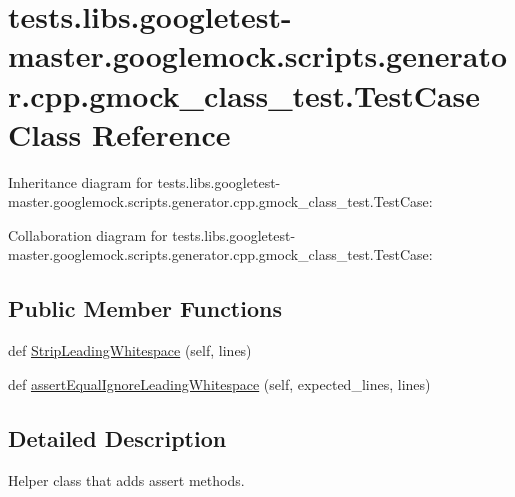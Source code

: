 \hypertarget{classtests_1_1libs_1_1googletest-master_1_1googlemock_1_1scripts_1_1generator_1_1cpp_1_1gmock__class__test_1_1TestCase}{}\section{tests.\+libs.\+googletest-\/master.googlemock.\+scripts.\+generator.\+cpp.\+gmock\+\_\+class\+\_\+test.\+Test\+Case Class Reference}
\label{classtests_1_1libs_1_1googletest-master_1_1googlemock_1_1scripts_1_1generator_1_1cpp_1_1gmock__class__test_1_1TestCase}


Inheritance diagram for tests.\+libs.\+googletest-\/master.googlemock.\+scripts.\+generator.\+cpp.\+gmock\+\_\+class\+\_\+test.\+Test\+Case\+:


Collaboration diagram for tests.\+libs.\+googletest-\/master.googlemock.\+scripts.\+generator.\+cpp.\+gmock\+\_\+class\+\_\+test.\+Test\+Case\+:
\subsection*{Public Member Functions}
\begin{DoxyCompactItemize}
\item 
def \hyperlink{classtests_1_1libs_1_1googletest-master_1_1googlemock_1_1scripts_1_1generator_1_1cpp_1_1gmock__class__test_1_1TestCase_a465deb85a3902d043e8713f08c2453a8}{Strip\+Leading\+Whitespace} (self, lines)
\item 
def \hyperlink{classtests_1_1libs_1_1googletest-master_1_1googlemock_1_1scripts_1_1generator_1_1cpp_1_1gmock__class__test_1_1TestCase_ac0f9b16096d5b52b568e268aa4c20dbf}{assert\+Equal\+Ignore\+Leading\+Whitespace} (self, expected\+\_\+lines, lines)
\end{DoxyCompactItemize}


\subsection{Detailed Description}
\begin{DoxyVerb}Helper class that adds assert methods.\end{DoxyVerb}
 

